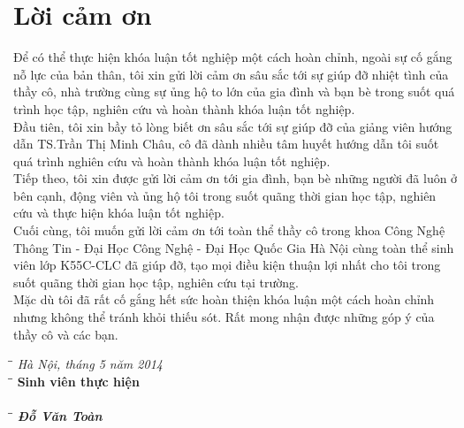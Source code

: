 \chapter*{Lời cảm ơn}

Để có thể thực hiện khóa luận tốt nghiệp một cách hoàn chỉnh, ngoài sự cố gắng nỗ lực của bản thân, tôi xin gửi lời cảm ơn sâu sắc tới sự giúp đỡ nhiệt tình của thầy cô, nhà trường cùng sự ủng hộ to lớn của gia đình và bạn bè trong suốt quá trình học tập, nghiên cứu và hoàn thành khóa luận tốt nghiệp.\\

Đầu tiên, tôi xin bầy tỏ lòng biết ơn sâu sắc tới sự giúp đỡ của giảng viên hướng dẫn TS.Trần Thị Minh Châu, cô đã dành nhiều tâm huyết hướng dẫn tôi suốt quá trình nghiên cứu và hoàn thành khóa luận tốt nghiệp.\\

Tiếp theo, tôi xin được gửi lời cảm ơn tới gia đình, bạn bè những người đã luôn ở bên cạnh, động viên và ủng hộ tôi trong suốt quãng thời gian học tập, nghiên cứu và thực hiện khóa luận tốt nghiệp.\\ 

Cuối cùng, tôi muốn gửi lời cảm ơn tới toàn thể thầy cô trong khoa Công Nghệ Thông Tin - Đại Học Công Nghệ - Đại Học Quốc Gia Hà Nội cùng toàn thể sinh viên lớp K55C-CLC đã giúp đỡ, tạo mọi điều kiện thuận lợi nhất cho tôi trong suốt quãng thời gian học tập, nghiên cứu tại trường. \\

Mặc dù tôi đã rất cố gắng hết sức hoàn thiện khóa luận một cách hoàn chỉnh nhưng không thể tránh khỏi thiếu sót. Rất mong nhận được những góp ý của thầy cô và các bạn. 

\vspace{2 cm}
\begin{tabbing}
\hspace{3in} \= \= \kill
\> \textit{Hà Nội, tháng 5 năm 2014}\\
\hspace{3.2in} \= \= \kill
\> \textbf{Sinh viên thực hiện}\\\\
\hspace{3.3in} \= \= \kill
\> \textbf{\textit{Đỗ Văn Toàn}}
\end{tabbing}